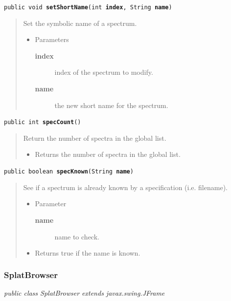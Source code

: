 \documentclass[twoside,11pt]{article}
\renewcommand{\_}{\texttt{\symbol{95}}}
\newcommand{\startsection}[4]{
   \subsubsection{\label{#3}{#2}}
   #4
}
\newcommand{\method}[1]{\texttt{#1}}
\newenvironment{desc}{\begin{quote}}{\end{quote}}
\begin{document}
\method{public void \textbf{setShortName}(\texttt{int} \textbf{index}, \texttt{String} \textbf{name})\label{l330}\label{l331}}
\begin{desc}Set the symbolic name of a spectrum.
\begin{itemize}
\item{Parameters
  \begin{description}
   \item[\textbf{index}]{index of the spectrum to modify.}
   \item[\textbf{name}]{the new short name for the spectrum.}
  \end{description}}
\end{itemize}
\end{desc}

\method{public int \textbf{specCount}()\label{l332}\label{l333}}
\begin{desc}Return the number of spectra in the global list.
\begin{itemize}
\item{Returns the number of spectra in the global list. }
\end{itemize}
\end{desc}

\method{public boolean \textbf{specKnown}(\texttt{String} \textbf{name})\label{l334}\label{l335}}
\begin{desc}See if a spectrum is already known by a specification (i.e. filename).
\begin{itemize}
\item{Parameter
  \begin{description}
   \item[\textbf{name}]{name to check.}
  \end{description}}
\end{itemize}
\begin{itemize}
\item{Returns true if the name is known. }
\end{itemize}
\end{desc}

\startsection{Class}{SplatBrowser}{l260}

\fbox{\parbox{\textwidth}{
\textit{public
 class SplatBrowser extends javax.swing.JFrame}
}} %



\end{document}
